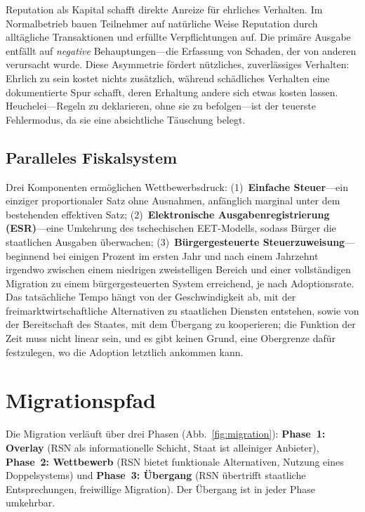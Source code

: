\documentclass[11pt,a4paper,twocolumn]{article}
\begin{document}
Reputation als Kapital schafft direkte Anreize für ehrliches Verhalten. Im Normalbetrieb bauen Teilnehmer auf natürliche Weise Reputation durch alltägliche Transaktionen und erfüllte Verpflichtungen auf. Die primäre Ausgabe entfällt auf \emph{negative} Behauptungen---die Erfassung von Schaden, der von anderen verursacht wurde. Diese Asymmetrie fördert nützliches, zuverlässiges Verhalten: Ehrlich zu sein kostet nichts zusätzlich, während schädliches Verhalten eine dokumentierte Spur schafft, deren Erhaltung andere sich etwas kosten lassen. Heuchelei---Regeln zu deklarieren, ohne sie zu befolgen---ist der teuerste Fehlermodus, da sie eine absichtliche Täuschung belegt.

\subsection{Paralleles Fiskalsystem}

Drei Komponenten ermöglichen Wettbewerbsdruck: (1)~\textbf{Einfache Steuer}---ein einziger proportionaler Satz ohne Ausnahmen, anfänglich marginal unter dem bestehenden effektiven Satz; (2)~\textbf{Elektronische Ausgabenregistrierung (ESR)}---eine Umkehrung des tschechischen EET-Modells, sodass Bürger die staatlichen Ausgaben überwachen; (3)~\textbf{Bürgergesteuerte Steuerzuweisung}---beginnend bei einigen Prozent im ersten Jahr und nach einem Jahrzehnt irgendwo zwischen einem niedrigen zweistelligen Bereich und einer vollständigen Migration zu einem bürgergesteuerten System erreichend, je nach Adoptionsrate. Das tatsächliche Tempo hängt von der Geschwindigkeit ab, mit der freimarktwirtschaftliche Alternativen zu staatlichen Diensten entstehen, sowie von der Bereitschaft des Staates, mit dem Übergang zu kooperieren; die Funktion der Zeit muss nicht linear sein, und es gibt keinen Grund, eine Obergrenze dafür festzulegen, wo die Adoption letztlich ankommen kann.

\section{Migrationspfad}

Die Migration verläuft über drei Phasen (Abb.~\ref{fig:migration}): \textbf{Phase~1: Overlay} (RSN als informationelle Schicht, Staat ist alleiniger Anbieter), \textbf{Phase~2: Wettbewerb} (RSN bietet funktionale Alternativen, Nutzung eines Doppelsystems) und \textbf{Phase~3: Übergang} (RSN übertrifft staatliche Entsprechungen, freiwillige Migration). Der Übergang ist in jeder Phase umkehrbar.
\end{document}
